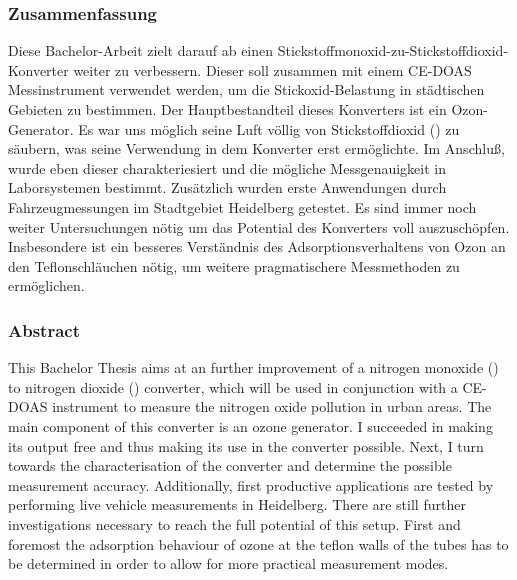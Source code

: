 
\subsubsection*{Zusammenfassung}
\label{sec:Zusammenfassung}

Diese Bachelor-Arbeit zielt darauf ab einen
Stickstoffmonoxid-zu-Stickstoffdioxid-Konverter weiter zu
verbessern. Dieser soll zusammen mit einem CE-DOAS Messinstrument
verwendet werden, um die Stickoxid-Belastung in städtischen Gebieten
zu bestimmen. Der Hauptbestandteil dieses Konverters ist ein
Ozon-Generator. Es war uns möglich seine Luft völlig von
Stickstoffdioxid () zu säubern, was seine Verwendung in dem
Konverter erst ermöglichte. Im Anschluß, wurde eben dieser
charakteriesiert und die mögliche  Messgenauigkeit in
Laborsystemen bestimmt. Zusätzlich wurden erste Anwendungen durch
Fahrzeugmessungen im Stadtgebiet Heidelberg getestet. Es sind immer
noch weiter Untersuchungen nötig um das Potential des Konverters voll
auszuschöpfen. Insbesondere ist ein besseres Verständnis des
Adsorptionsverhaltens von Ozon an den Teflonschläuchen nötig, um
weitere pragmatischere Messmethoden zu ermöglichen.


\subsubsection*{Abstract}
\label{sec:abstract}

This Bachelor Thesis aims at an further improvement of a nitrogen
monoxide () to nitrogen dioxide () converter, which
will be used in conjunction with a CE-DOAS instrument to measure the
nitrogen oxide pollution in urban areas. The main component of this
converter is an ozone generator. I succeeded in making its output
 free and thus making its use in the converter possible. Next,
I turn towards the characterisation of the converter and determine the
possible  measurement accuracy. Additionally, first productive
applications are tested by performing live vehicle measurements in
Heidelberg. There are still further investigations necessary to reach
the full potential of this setup. First and foremost the adsorption
behaviour of ozone at the teflon walls of the tubes has to be
determined in order to allow for more practical measurement modes.

